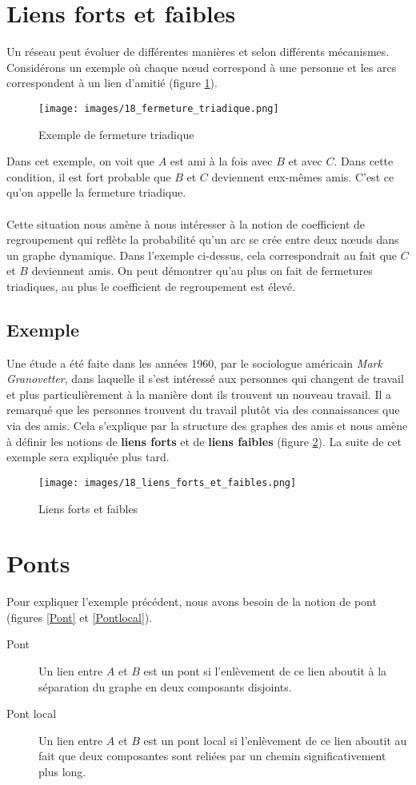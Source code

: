 \section{Liens forts et faibles}
Un réseau peut évoluer de différentes manières et selon différents mécanismes.
Considérons un exemple où chaque n\oe ud correspond à une personne et les arcs correspondent à un lien d'amitié (figure \ref{fermeture_triadique}).
	\begin{figure}
	\center
	\texttt{[image: images/18\_fermeture\_triadique.png]}
	\caption{\label{fermeture_triadique} Exemple de fermeture triadique}
	\end{figure}
Dans cet exemple, on voit que $A$ est ami à la fois avec $B$ et avec $C$. Dans cette condition, il est fort probable que $B$ et $C$ deviennent eux-mêmes amis. C'est ce qu'on appelle la fermeture triadique.\\
\\
Cette situation nous amène à nous intéresser à la notion de coefficient de regroupement qui reflète la probabilité qu'un arc se crée entre deux n\oe uds dans un graphe dynamique. 
Dans l'exemple ci-dessus, cela correspondrait au fait que $C$ et $B$ deviennent amis. On peut démontrer qu'au plus on fait de fermetures triadiques, au plus le coefficient de regroupement est élevé.

\subsection*{Exemple}
Une étude a été faite dans les années 1960, par le sociologue américain \textit{Mark Granovetter}, dans laquelle il s'est intéressé aux personnes qui changent de travail et plus particulièrement à la manière dont ils trouvent un nouveau travail. Il a remarqué que les personnes trouvent du travail plutôt via des connaissances que via des amis. Cela s'explique par la structure des graphes des amis et nous amène à définir les notions de \textbf{liens forts} et de \textbf{liens faibles} (figure \ref{liens_forts_et_faibles}). La suite de cet exemple sera expliquée plus tard.\\
	\begin{figure}[!h]
	\center
	\texttt{[image: images/18\_liens\_forts\_et\_faibles.png]}
	\caption{\label{liens_forts_et_faibles} Liens forts et faibles}
	\end{figure}

    
\section{Ponts}
Pour expliquer l'exemple précédent, nous avons besoin de la notion de pont (figures \ref{Pont} et \ref{Pontlocal}).
	\begin{description}
	\item[Pont] Un lien entre $A$ et $B$ est un pont si l'enlèvement de ce lien aboutit à la séparation du graphe en deux composants disjoints.
    \item[Pont local] Un lien entre $A$ et $B$ est un pont local si l'enlèvement de ce lien aboutit au fait que deux composantes sont reliées par un chemin significativement plus long.
    \end{description}
    
